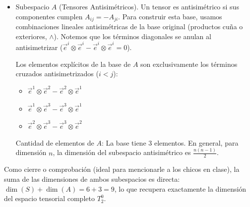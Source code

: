 \documentclass[11pt,spanish]{article}
\begin{document}
\begin{itemize}
\begin{itemize}
La base de $S$ está formada por los productos tensoriales simétricos (a veces denotados con el producto $\vee$). Los elementos explícitos son:
\begin{itemize}
\item Términos diagonales ($i = j$):
\begin{itemize}
\item $\vec{e}^1 \otimes \vec{e}^1$
\item $\vec{e}^2 \otimes \vec{e}^2$
\item $\vec{e}^3 \otimes \vec{e}^3$
\end{itemize}  
\item Términos cruzados simetrizados ($i < j$):
\begin{itemize}
\item $\vec{e}^1 \otimes \vec{e}^2 + \vec{e}^2 \otimes \vec{e}^1$
\item $\vec{e}^1 \otimes \vec{e}^3 + \vec{e}^3 \otimes \vec{e}^1$
\item $\vec{e}^2 \otimes \vec{e}^3 + \vec{e}^3 \otimes \vec{e}^2$
\end{itemize}
\item Cantidad de elementos de $S$: Contando los elementos listados arriba, vemos que la base tiene 6 elementos. En general, para dimensión $n$, la dimensión del subespacio simétrico es $\frac{n(n+1)}{2}$.
\end{itemize}

\item Subespacio $A$ (Tensores Antisimétricos).
Un tensor es antisimétrico si sus componentes cumplen $A_{ij} = -A_{ji}$. Para construir esta base, usamos combinaciones lineales antisimétricas de la base original (productos cuña o exteriores, $\wedge$). Notemos que los términos diagonales se anulan al antisimetrizar ($\vec{e}^i \otimes \vec{e}^i - \vec{e}^i \otimes \vec{e}^i = 0$).

Los elementos explícitos de la base de $A$ son exclusivamente los términos cruzados antisimetrizados ($i < j$):
\begin{itemize}
\item $\vec{e}^1 \otimes \vec{e}^2 - \vec{e}^2 \otimes \vec{e}^1$
\item $\vec{e}^1 \otimes \vec{e}^3 - \vec{e}^3 \otimes \vec{e}^1$
\item $\vec{e}^2 \otimes \vec{e}^3 - \vec{e}^3 \otimes \vec{e}^2$
\end{itemize}

Cantidad de elementos de $A$: La base tiene 3 elementos. En general, para dimensión $n$, la dimensión del subespacio antisimétrico es $\frac{n(n-1)}{2}$.
\end{itemize}

Como cierre o comprobación (ideal para mencionarle a los chicos en clase), la suma de las dimensiones de ambos subespacios es directa: $\dim(S) + \dim(A) = 6 + 3 = 9$, lo que recupera exactamente la dimensión del espacio tensorial completo $T_2^0$.
\end{itemize}
\end{document}
